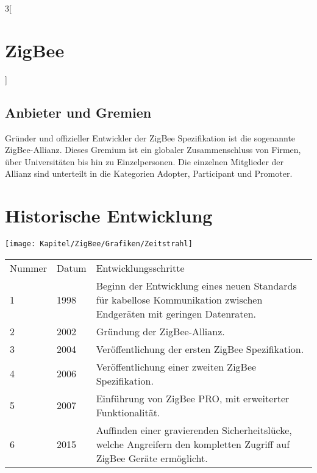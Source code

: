 \begin{multicols}{3}[\section{ZigBee}]
\subsection*{Anbieter und Gremien}
Gründer und offizieller Entwickler der ZigBee Spezifikation ist die sogenannte ZigBee-Allianz. Dieses Gremium ist ein globaler Zusammenschluss von Firmen, über Universitäten bis hin zu Einzelpersonen. Die einzelnen Mitglieder der Allianz sind unterteilt in die Kategorien Adopter, Participant und Promoter.


\end{multicols}
\newpage
\section*{Historische Entwicklung}
\texttt{[image: Kapitel/ZigBee/Grafiken/Zeitstrahl]}
\par
\noindent
{}
\begin{tabular}{p{1 cm}p{3 cm}p{13.55 cm}}
	Nummer & Datum & Entwicklungsschritte~\cite{zigbee.5}\\
	1 & 1998 & Beginn der Entwicklung eines neuen Standards für kabellose Kommunikation zwischen Endgeräten mit geringen Datenraten.\\
	2 & 2002 & Gründung der ZigBee-Allianz.\\
	3 & 2004 & Veröffentlichung der ersten ZigBee Spezifikation.\\
	4 & 2006 & Veröffentlichung einer zweiten ZigBee Spezifikation.\\
	5 & 2007 & Einführung von ZigBee PRO, mit erweiterter Funktionalität.\\
	6 & 2015 & Auffinden einer gravierenden Sicherheitslücke, welche Angreifern den kompletten Zugriff auf ZigBee Geräte ermöglicht.\\
\end{tabular}
\par
